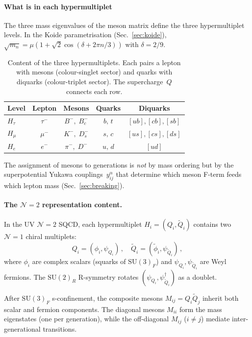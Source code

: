 \documentclass[aps,prd,twocolumn,showpacs,preprintnumbers,superscriptaddress]{revtex4-2}
\newcommand{\SU}{\mathrm{SU}}
\begin{document}
\paragraph{What is in each hypermultiplet}

The three mass eigenvalues of the meson matrix define the
three hypermultiplet levels.
In the Koide parametrisation (Sec.~\ref{sec:koide}),
$\sqrt{m_n} = \mu(1 + \sqrt{2}\cos(\delta + 2\pi n/3))$
with $\delta = 2/9$.

\begin{table}[h]
\centering
\caption{Content of the three hypermultiplets.
  Each pairs a lepton with mesons (colour-singlet sector)
  and quarks with diquarks (colour-triplet sector).
  The supercharge~$Q$ connects each row.}
\label{tab:hyper}
\begin{tabular}{lcccc}
\toprule
Level & Lepton & Mesons & Quarks & Diquarks \\
\midrule
$H_\tau$ & $\tau^-$ & $B^-,\;B_c^-$ & $b,\,t$ &
  $[ub],[cb],[sb]$ \\
$H_\mu$ & $\mu^-$ & $K^-,\;D_s^-$ & $s,\,c$ &
  $[us],[cs],[ds]$ \\
$H_e$ & $e^-$ & $\pi^-,\;D^-$ & $u,\,d$ &
  $[ud]$ \\
\bottomrule
\end{tabular}
\end{table}

The assignment of mesons to generations is \emph{not} by
mass ordering but by the superpotential Yukawa
couplings~$y^\alpha_{ij}$ that determine which meson
F-term feeds which lepton mass (Sec.~\ref{sec:breaking}).

\paragraph{The $\mathcal{N}{=}2$ representation content.}

In the UV $\mathcal{N}{=}2$ SQCD, each hypermultiplet
$H_i = (Q_i, \tilde Q_i)$ contains two $\mathcal{N}{=}1$
chiral multiplets:
\begin{equation}
  Q_i = (\phi_i, \psi_{Q_i})\,,\quad
  \tilde Q_i = (\tilde\phi_i, \psi_{\tilde Q_i})\,,
\end{equation}
where $\phi_i$ are complex scalars (squarks of $\SU(3)_F$)
and $\psi_{Q_i}, \psi_{\tilde Q_i}$ are Weyl fermions.
The $\SU(2)_R$ R-symmetry rotates $(\psi_{Q_i},
\psi_{\tilde Q_i}^\dagger)$ as a doublet.

After $\SU(3)_F$ s-confinement, the composite mesons
$M_{ij} = Q_i \tilde Q_j$ inherit both scalar and
fermion components.
The diagonal mesons $M_{ii}$ form the mass eigenstates
(one per generation), while the off-diagonal $M_{ij}$
($i \neq j$) mediate inter-generational transitions.
\end{document}
